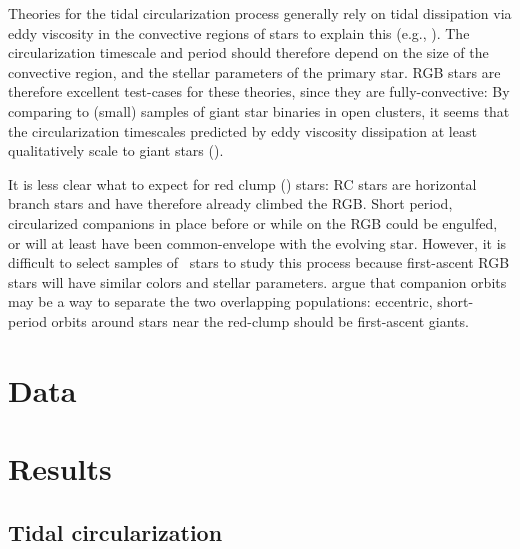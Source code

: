 \documentclass[modern, letterpaper]{aastex62}
\newcommand{\RC}{\acronym{RC}}
\begin{document}
Theories for the tidal circularization process generally rely on tidal
dissipation via eddy viscosity in the convective regions of stars to explain
this (e.g., \citealt{Zahn:1989}).
The circularization timescale and period should therefore depend on the size of
the convective region, and the stellar parameters of the primary star.
RGB stars are therefore excellent test-cases for these theories, since
they are fully-convective:
By comparing to (small) samples of giant star binaries in open clusters, it
seems that the circularization timescales predicted by eddy viscosity
dissipation at least qualitatively scale to giant stars
(\citealt{Verbunt:1995}).

It is less clear what to expect for red clump (\RC) stars:
RC stars are horizontal branch stars and have therefore already climbed the RGB.
Short period, circularized companions in place before or while on the RGB could
be engulfed, or will at least have been common-envelope with the evolving star.
However, it is difficult to select samples of \RC\ stars to study this process
because first-ascent RGB stars will have similar colors and stellar parameters.
\citet{Verbunt:1995} argue that companion orbits may be a way to separate the
two overlapping populations: eccentric, short-period orbits around stars near
the red-clump should be first-ascent giants.

\section{Data} \label{sec:data}



\section{Results}
\label{sec:results}

\subsection{Tidal circularization}
\end{document}
